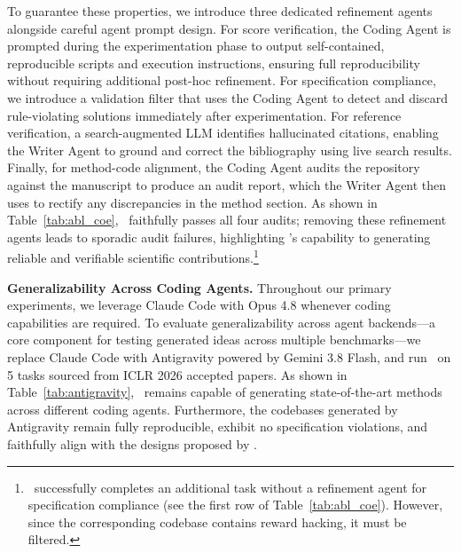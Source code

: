 To guarantee these properties, we introduce three dedicated refinement agents alongside careful agent prompt design. For score verification, the Coding Agent is prompted during the experimentation phase to output self-contained, reproducible scripts and execution instructions, ensuring full reproducibility without requiring additional post-hoc refinement. For specification compliance, we introduce a validation filter that uses the Coding Agent to detect and discard rule-violating solutions immediately after experimentation. For reference verification, a search-augmented LLM identifies hallucinated citations, enabling the Writer Agent to ground and correct the bibliography using live search results. Finally, for method-code alignment, the Coding Agent audits the repository against the manuscript to produce an audit report, which the Writer Agent then uses to rectify any discrepancies in the method section. As shown in Table~\ref{tab:abl_coe}, \sname~faithfully passes all four audits; removing these refinement agents leads to sporadic audit failures, highlighting \sname's capability to generating reliable and verifiable scientific contributions.\footnote{\sname~successfully completes an additional task without a refinement agent for specification compliance (see the first row of Table~\ref{tab:abl_coe}). However, since the corresponding codebase contains reward hacking, it must be filtered.}


\noindent\textbf{Generalizability Across Coding Agents.} Throughout our primary experiments, we leverage Claude Code with Opus 4.8 whenever coding capabilities are required. To evaluate generalizability across agent backends—a core component for testing generated ideas across multiple benchmarks—we replace Claude Code with Antigravity powered by Gemini 3.8 Flash, and run \sname~on 5 tasks sourced from ICLR 2026 accepted papers. As shown in Table~\ref{tab:antigravity}, \sname~remains capable of generating state-of-the-art methods across different coding agents. Furthermore, the codebases generated by Antigravity remain fully reproducible, exhibit no specification violations, and faithfully align with the designs proposed by \sname.